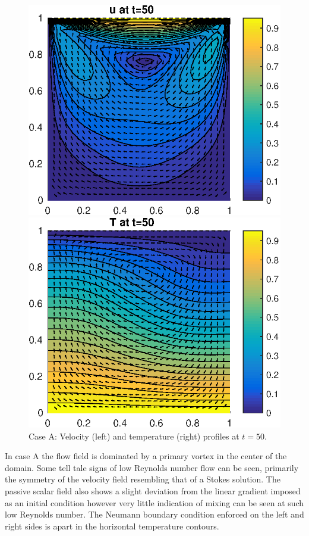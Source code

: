 \documentclass[10pt,a4paper]{article}
\begin{document}
\begin{figure}[H]
\centering
\begin{minipage}{.5\textwidth}
  \centering
  \includegraphics[width=.9\linewidth]{Part1_Case_A_Velocity.eps}
\end{minipage}%
\begin{minipage}{.5\textwidth}
  \centering
  \includegraphics[width=.9\linewidth]{Part1_Case_A_Temp.eps}
\end{minipage}
\caption{Case A: Velocity (left) and temperature (right) profiles at $t = 50$.}
\label{fig:1A}
\end{figure}

In case A the flow field is dominated by a primary vortex in the center of the domain. Some tell tale signs of low Reynolds number flow can be seen, primarily the symmetry of the velocity field resembling that of a Stokes solution. The passive scalar field also shows a slight deviation from the linear gradient imposed as an initial condition however very little indication of mixing can be seen at such low Reynolds number. The Neumann boundary condition enforced on the left and right sides is apart in the horizontal temperature contours.
\end{document}
